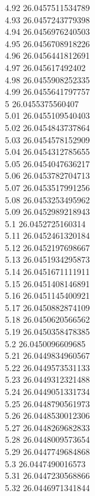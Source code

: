 {4.92	26.0457511534789\\
4.93	26.0457243779398\\
4.94	26.0456976240503\\
4.95	26.0456708918226\\
4.96	26.0456441812691\\
4.97	26.045617492402\\
4.98	26.0455908252335\\
4.99	26.0455641797757\\
5	26.0455375560407\\
5.01	26.0455109540403\\
5.02	26.0454843737864\\
5.03	26.0454578152909\\
5.04	26.0454312785655\\
5.05	26.0454047636217\\
5.06	26.0453782704713\\
5.07	26.0453517991256\\
5.08	26.0453253495962\\
5.09	26.0452989218943\\
5.1	26.0452725160314\\
5.11	26.0452461320184\\
5.12	26.0452197698667\\
5.13	26.0451934295873\\
5.14	26.0451671111911\\
5.15	26.0451408146891\\
5.16	26.0451145400921\\
5.17	26.0450882874109\\
5.18	26.0450620566562\\
5.19	26.0450358478385\\
5.2	26.0450096609685\\
5.21	26.0449834960567\\
5.22	26.0449573531133\\
5.23	26.0449312321488\\
5.24	26.0449051331734\\
5.25	26.0448790561973\\
5.26	26.0448530012306\\
5.27	26.0448269682833\\
5.28	26.0448009573654\\
5.29	26.0447749684868\\
5.3	26.0447490016573\\
5.31	26.0447230568866\\
5.32	26.0446971341844\\
}
